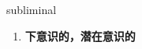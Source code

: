 
\begin{frame}
{\huge subliminal}
\begin{center}
\begin{enumerate}\Large
  \item \textbf{下意识的，潜在意识的}
\end{enumerate}
\end{center}
\end{frame}
